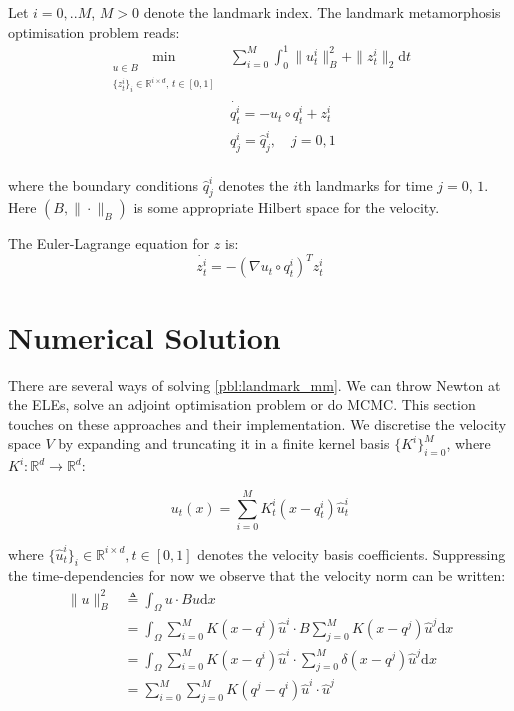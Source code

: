 \documentclass{article}
\newcommand{\norm}[2]{\| #1 \|_{ #2 }}
\newcommand{\bnorm}[1]{\norm{ #1 }{B}}
\newcommand{\ltwonorm}[1]{\norm{ #1 }{2}}
\newcommand{\diff}[1]{\text{d} #1}
\begin{document}
Let $i=0,..M$, $M>0$ denote the landmark index. The landmark metamorphosis 
optimisation problem reads:
\begin{subequations}\label{pbl:landmark_mm}
\begin{align}
\min_{\substack{u\in B\\ \{z^i_t\}_i \in \mathbb{R}^{i\times d},\, t\in[0,1]}} & \sum_{i=0}^M \int_0^1 \bnorm{u^i_t}^2 + \ltwonorm{z^i_t} \diff{t}\\
            & \dot{q^i_t} = - u_t \circ q^i_t + z^i_t \label{eq:ele_q} \\
            & q^i_j = \hat q^i_j, \quad j=0,1 \label{eq:ele_q_bcs}\\
\end{align}
\end{subequations}

where the boundary conditions $\hat q^i_j$ denotes the $i$th landmarks for time
$j=0,\,1$. Here $(B,\bnorm{\cdot})$ is some appropriate Hilbert space for the
velocity.

The Euler-Lagrange equation for $z$ is:
\begin{equation}\label{eq:ele_z}
\dot{z^i_t} = - (\nabla u_t \circ q^i_t)^T z^i_t
\end{equation}

\section{Numerical Solution}

There are several ways of solving \eqref{pbl:landmark_mm}. We can throw Newton
at the ELEs, solve an adjoint optimisation problem or do MCMC. This section
touches on these approaches and their implementation. We discretise the velocity
space $V$ by expanding and truncating it in a finite kernel basis
$\{K^i\}_{i=0}^M$, where $K^i : \mathbb{R}^d \rightarrow \mathbb{R}^d$:

\begin{equation}
u_t(x) = \sum_{i=0}^M K^i_t(x - q^i_t)\hat u^i_t \label{eq:ele_u_disc}
\end{equation}

where $\{\hat u^i_t\}_i \in \mathbb{R}^{i\times d}, t\in[0,1]$ denotes the
velocity basis coefficients. Suppressing the time-dependencies for now we
observe that the velocity norm can be written:
\begin{align*}
\bnorm{u}^2 & \triangleq \int_\Omega u\cdot Bu \diff{x}\\
            & = \int_\Omega\sum_{i=0}^M K(x-q^i)\hat u^i \cdot B \sum_{j=0}^M K(x-q^j)\hat u^j \diff{x}\\
            & = \int_\Omega \sum_{i=0}^M K(x-q^i)\hat u^i \cdot \sum_{j=0}^M
            \delta (x-q^j)\hat u^j \diff{x}\\
            & = \sum_{i=0}^M \sum_{j=0}^M K(q^j-q^i)\hat u^i \cdot\hat u^j
\end{align*}
\end{document}

